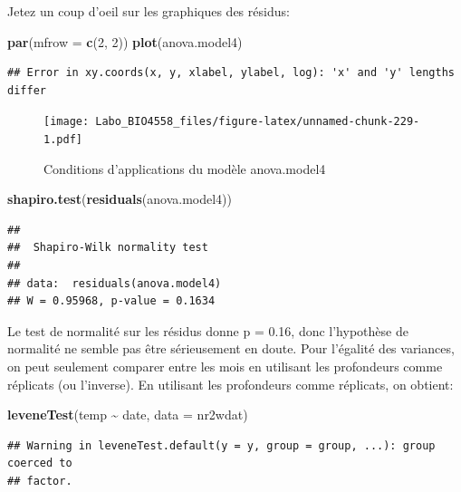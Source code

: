 \documentclass[
  12pt,
]{book}
\newenvironment{Shaded}{\begin{snugshade}}{\end{snugshade}}
\newcommand{\DataTypeTok}[1]{\textcolor[rgb]{0.13,0.29,0.53}{#1}}
\newcommand{\DecValTok}[1]{\textcolor[rgb]{0.00,0.00,0.81}{#1}}
\newcommand{\KeywordTok}[1]{\textcolor[rgb]{0.13,0.29,0.53}{\textbf{#1}}}
\newcommand{\NormalTok}[1]{#1}
\newcommand{\OperatorTok}[1]{\textcolor[rgb]{0.81,0.36,0.00}{\textbf{#1}}}
\newcommand{\StringTok}[1]{\textcolor[rgb]{0.31,0.60,0.02}{#1}}
\begin{document}
Jetez un coup d'oeil sur les graphiques des résidus:

\begin{Shaded}
\begin{Highlighting}[]
\KeywordTok{par}\NormalTok{(}\DataTypeTok{mfrow =} \KeywordTok{c}\NormalTok{(}\DecValTok{2}\NormalTok{, }\DecValTok{2}\NormalTok{))}
\KeywordTok{plot}\NormalTok{(anova.model4)}
\end{Highlighting}
\end{Shaded}

\begin{verbatim}
## Error in xy.coords(x, y, xlabel, ylabel, log): 'x' and 'y' lengths differ
\end{verbatim}

\begin{figure}
\centering
\texttt{[image: Labo\_BIO4558\_files/figure-latex/unnamed-chunk-229-1.pdf]}
\caption{\label{fig:unnamed-chunk-229}Conditions d'applications du modèle anova.model4}
\end{figure}

\begin{Shaded}
\begin{Highlighting}[]
\KeywordTok{shapiro.test}\NormalTok{(}\KeywordTok{residuals}\NormalTok{(anova.model4))}
\end{Highlighting}
\end{Shaded}

\begin{verbatim}
## 
##  Shapiro-Wilk normality test
## 
## data:  residuals(anova.model4)
## W = 0.95968, p-value = 0.1634
\end{verbatim}

Le test de normalité sur les résidus donne p = 0.16, donc l'hypothèse de normalité ne semble pas être sérieusement en doute. Pour l'égalité des variances, on peut seulement comparer entre les mois en utilisant les profondeurs comme réplicats (ou l'inverse). En utilisant les profondeurs comme réplicats, on obtient:

\begin{Shaded}
\begin{Highlighting}[]
\KeywordTok{leveneTest}\NormalTok{(temp }\OperatorTok{\textasciitilde{}}\StringTok{ }\NormalTok{date, }\DataTypeTok{data =}\NormalTok{ nr2wdat)}
\end{Highlighting}
\end{Shaded}

\begin{verbatim}
## Warning in leveneTest.default(y = y, group = group, ...): group coerced to
## factor.
\end{verbatim}
\end{document}
